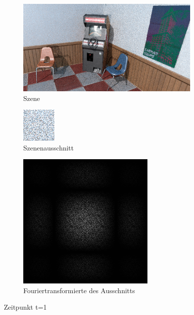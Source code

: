 \newpage
\label{fig:Retargetbilderstrecke}
\begin{figure}[H]

    \begin{subfigure}{\textwidth}
        \centering \includegraphics[scale=.25]{content/TemporalerAlg/Bilder/Retargeting/Screenshots/seed_debug_3.0_selection.png}
        \caption{Szene}
        \label{fig:Retargeting_And_Sorting_Szene_t1}
    \end{subfigure}
    \begin{subfigure}{0.5\textwidth}
        \centering \includegraphics[width=0.4\linewidth]{content/TemporalerAlg/Bilder/Retargeting/Screenshots/seed_debug_3.0_ausschnitt.png} 
        \caption{Szenenausschnitt}
        \label{fig:Retargeting_And_Sorting_ausschnitt_t1}
    \end{subfigure}
    \begin{subfigure}{0.5\textwidth}
        \centering \includegraphics[width=0.4\linewidth]{content/TemporalerAlg/Bilder/Retargeting/Screenshots/Spektren/seed_debug_3.0_ausschnitt.png}
        \caption{Fouriertransformierte des Ausschnitts}
        \label{fig:Retargeting_And_Sorting_Fouriertransformierte_t1}
    \end{subfigure}
        \caption{Zeitpunkt t=1}
        \label{fig:Retargeting_And_Sorting_Verlauf_t1}
\end{figure}

